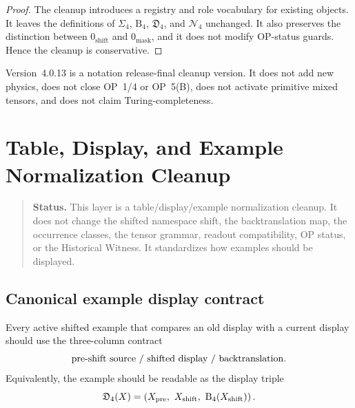 \begin{proof}
The cleanup introduces a registry and role vocabulary for existing objects.
It leaves the definitions of $\Sigma_4$, $\mathrm B_4$, $\mathfrak D_4$, and
$\mathcal N_4$ unchanged. It also preserves the distinction between
$0_{\mathrm{shift}}$ and $0_{\mathrm{mask}}$, and it does not modify OP-status
guards. Hence the cleanup is conservative.
\end{proof}

\begin{remark}
\label{rem:v403-non-claim}
Version~4.0.13 is a notation release-final cleanup version. It does not add new physics,
does not close OP~1/4 or OP~5(B), does not activate primitive mixed tensors,
and does not claim Turing-completeness.
\end{remark}



\clearpage
\section{ Table, Display, and Example Normalization Cleanup}
\label{sec:v404-table-display-example-normalization-cleanup}

\begin{quote}\small
\noindent\textbf{Status.}
This  layer is a table/display/example normalization cleanup. It does
not change the shifted namespace shift, the backtranslation map, the occurrence
classes, the tensor grammar, readout compatibility, OP status, or the
Historical Witness. It standardizes how examples should be displayed.
\end{quote}

\subsection{Canonical example display contract}
\label{subsec:v404-canonical-example-display-contract}

\begin{definition}
\label{def:v404-canonical-example-display-contract}
Every active shifted example that compares an old display with a current display
should use the three-column contract
\[
 \text{pre-shift source}\ /\ \text{shifted display}\ /\ \text{backtranslation} .
\]
Equivalently, the example should be readable as the display triple
\[
 \mathfrak D_4(X)
 =
 \left(X_{\mathrm{pre}},\ X_{\mathrm{shift}},\ \mathrm B_4(X_{\mathrm{shift}})\right).
\]
\end{definition}

